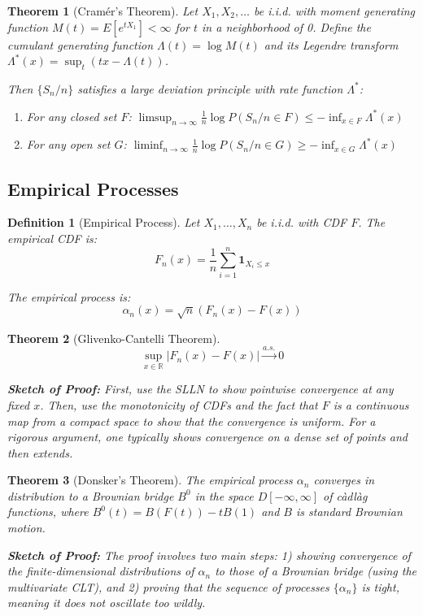 \documentclass[12pt,a4paper]{article}
\newtheorem{theorem}{Theorem}[section]
\newtheorem{definition}{Definition}[section]
\theoremstyle{remark}
\begin{document}
\begin{theorem}[Cramér's Theorem]
Let $X_1, X_2, \ldots$ be i.i.d. with moment generating function $M(t) = E[e^{tX_1}] < \infty$ for $t$ in a neighborhood of 0. Define the cumulant generating function $\Lambda(t) = \log M(t)$ and its Legendre transform $\Lambda^*(x) = \sup_t (tx - \Lambda(t))$.

Then $\{S_n/n\}$ satisfies a large deviation principle with rate function $\Lambda^*$:
\begin{enumerate}
\item For any closed set $F$: $\limsup_{n \to \infty} \frac{1}{n} \log P(S_n/n \in F) \leq -\inf_{x \in F} \Lambda^*(x)$
\item For any open set $G$: $\liminf_{n \to \infty} \frac{1}{n} \log P(S_n/n \in G) \geq -\inf_{x \in G} \Lambda^*(x)$
\end{enumerate}
\end{theorem}

\subsection{Empirical Processes}

\begin{definition}[Empirical Process]
Let $X_1, \ldots, X_n$ be i.i.d. with CDF $F$. The empirical CDF is:
$$F_n(x) = \frac{1}{n} \sum_{i=1}^n \mathbf{1}_{X_i \leq x}$$

The empirical process is:
$$\alpha_n(x) = \sqrt{n}(F_n(x) - F(x))$$
\end{definition}

\begin{theorem}[Glivenko-Cantelli Theorem]
$$\sup_{x \in \mathbb{R}} |F_n(x) - F(x)| \stackrel{a.s.}{\to} 0$$

\textbf{Sketch of Proof:} First, use the SLLN to show pointwise convergence at any fixed $x$. Then, use the monotonicity of CDFs and the fact that $F$ is a continuous map from a compact space to show that the convergence is uniform. For a rigorous argument, one typically shows convergence on a dense set of points and then extends.
\end{theorem}

\begin{theorem}[Donsker's Theorem]
The empirical process $\alpha_n$ converges in distribution to a Brownian bridge $B^0$ in the space $D[-\infty, \infty]$ of càdlàg functions, where $B^0(t) = B(F(t)) - tB(1)$ and $B$ is standard Brownian motion.

\textbf{Sketch of Proof:} The proof involves two main steps: 1) showing convergence of the finite-dimensional distributions of $\alpha_n$ to those of a Brownian bridge (using the multivariate CLT), and 2) proving that the sequence of processes $\{\alpha_n\}$ is tight, meaning it does not oscillate too wildly.
\end{theorem}
\end{document}
